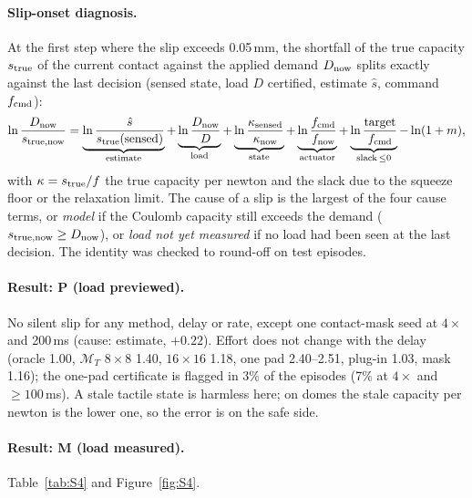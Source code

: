 \documentclass[11pt,a4paper]{article}
\newcommand{\M}{\mathcal M}
\begin{document}
\paragraph{Slip-onset diagnosis.} At the first step where the slip exceeds 0.05\,mm, the shortfall of the true capacity $s_{\rm true}$ of the current
contact against the applied demand $D_{\rm now}$ splits exactly against the last decision (sensed state, load $D$ certified, estimate $\hat s$,
command $f_{\rm cmd}$):
\begin{align}
    \ln\frac{D_{\rm now}}{s_{\rm true,now}}
    =\underbrace{\ln\frac{\hat s}{s_{\rm true}(\text{sensed})}}_{\text{estimate}}
    +\underbrace{\ln\frac{D_{\rm now}}{D}}_{\text{load}}
    +\underbrace{\ln\frac{\kappa_{\rm sensed}}{\kappa_{\rm now}}}_{\text{state}}
    +\underbrace{\ln\frac{f_{\rm cmd}}{f_{\rm now}}}_{\text{actuator}}
    +\underbrace{\ln\frac{\text{target}}{f_{\rm cmd}}}_{\text{slack}\,\le0}
    -\ln(1+m),
\end{align}
with $\kappa=s_{\rm true}/f$ the true capacity per newton and the slack due to the squeeze floor or the relaxation limit. The cause of a slip is
the largest of the four cause terms, or \emph{model} if the Coulomb capacity still exceeds the demand ($s_{\rm true,now}\ge D_{\rm now}$), or
\emph{load not yet measured} if no load had been seen at the last decision. The identity was checked to round-off on test episodes.

\paragraph{Result: P (load previewed).} No silent slip for any method, delay or rate, except one contact-mask seed at $4\times$ and 200\,ms (cause:
estimate, $+0.22$). Effort does not change with the delay (oracle 1.00, $\M_T$ $8\times8$ 1.40, $16\times16$ 1.18, one pad 2.40--2.51, plug-in 1.03,
mask 1.16); the one-pad certificate is flagged in 3\% of the episodes (7\% at $4\times$ and $\ge100$\,ms). A stale tactile state is harmless here; on
domes the stale capacity per newton is the lower one, so the error is on the safe side.

\paragraph{Result: M (load measured).} Table~\ref{tab:S4} and Figure~\ref{fig:S4}.
\end{document}
